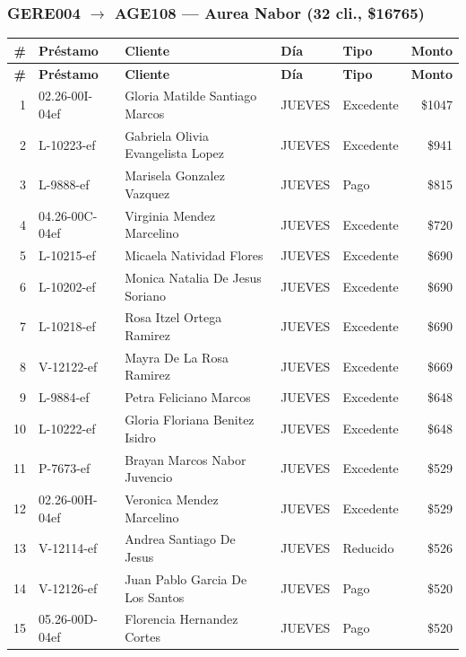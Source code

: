 \documentclass[11pt,a4paper]{article}
\newcommand{\money}[1]{\$\num{#1}}
\begin{document}
\subsubsection{GERE004 $\rightarrow$ AGE108 --- Aurea Nabor (32 cli., \money{16765})}


\begin{center}
\renewcommand{\arraystretch}{1.1}
\footnotesize
\begin{longtable}{rlp{5.5cm}llr}
\toprule
\textbf{\#} & \textbf{Pr\'estamo} & \textbf{Cliente} & \textbf{D\'ia} & \textbf{Tipo} & \textbf{Monto} \\
\midrule
\endfirsthead
\toprule
\textbf{\#} & \textbf{Pr\'estamo} & \textbf{Cliente} & \textbf{D\'ia} & \textbf{Tipo} & \textbf{Monto} \\
\midrule
\endhead
1 & 02.26-00I-04ef & Gloria Matilde Santiago Marcos & JUEVES & Excedente & \money{1047} \\
2 & L-10223-ef & Gabriela Olivia Evangelista Lopez & JUEVES & Excedente & \money{941} \\
3 & L-9888-ef & Marisela Gonzalez Vazquez & JUEVES & Pago & \money{815} \\
4 & 04.26-00C-04ef & Virginia Mendez Marcelino & JUEVES & Excedente & \money{720} \\
5 & L-10215-ef & Micaela Natividad Flores & JUEVES & Excedente & \money{690} \\
6 & L-10202-ef & Monica Natalia De Jesus Soriano & JUEVES & Excedente & \money{690} \\
7 & L-10218-ef & Rosa Itzel Ortega Ramirez & JUEVES & Excedente & \money{690} \\
8 & V-12122-ef & Mayra De La Rosa Ramirez & JUEVES & Excedente & \money{669} \\
9 & L-9884-ef & Petra Feliciano Marcos & JUEVES & Excedente & \money{648} \\
10 & L-10222-ef & Gloria Floriana Benitez Isidro & JUEVES & Excedente & \money{648} \\
11 & P-7673-ef & Brayan Marcos Nabor Juvencio & JUEVES & Excedente & \money{529} \\
12 & 02.26-00H-04ef & Veronica Mendez Marcelino & JUEVES & Excedente & \money{529} \\
13 & V-12114-ef & Andrea Santiago De Jesus & JUEVES & Reducido & \money{526} \\
14 & V-12126-ef & Juan Pablo Garcia De Los Santos & JUEVES & Pago & \money{520} \\
15 & 05.26-00D-04ef & Florencia Hernandez Cortes & JUEVES & Pago & \money{520} \\

\end{longtable}
\end{center}
\end{document}
